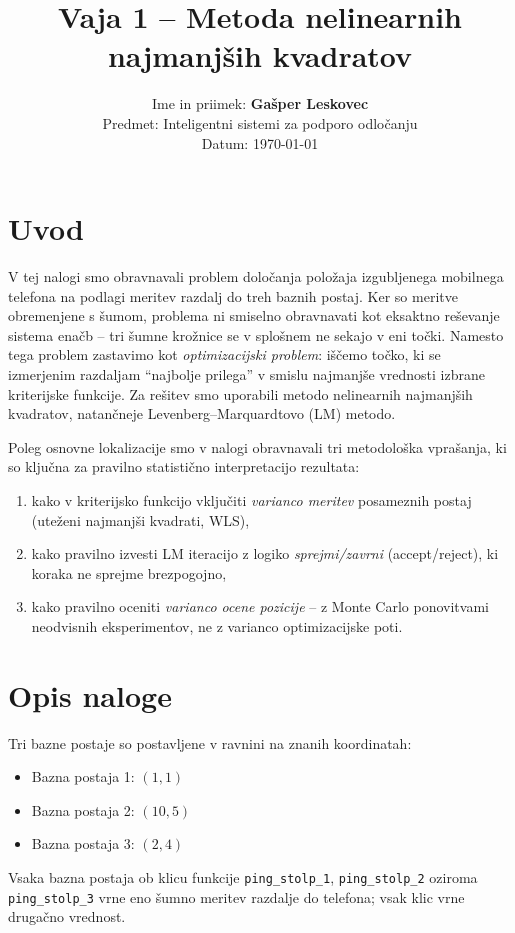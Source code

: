 \documentclass[a4paper,11pt]{article}
\title{Vaja 1 -- Metoda nelinearnih najmanjših kvadratov}
\author{Ime in priimek: \textbf{Gašper Leskovec} \\
Predmet: Inteligentni sistemi za podporo odločanju \\
Datum: \today}
\date{}
\begin{document}
\maketitle

\section{Uvod}
V tej nalogi smo obravnavali problem določanja položaja izgubljenega mobilnega telefona na podlagi meritev razdalj do treh baznih postaj. Ker so meritve obremenjene s šumom, problema ni smiselno obravnavati kot eksaktno reševanje sistema enačb -- tri šumne krožnice se v splošnem ne sekajo v eni točki. Namesto tega problem zastavimo kot \emph{optimizacijski problem}: iščemo točko, ki se izmerjenim razdaljam ``najbolje prilega'' v smislu najmanjše vrednosti izbrane kriterijske funkcije. Za rešitev smo uporabili metodo nelinearnih najmanjših kvadratov, natančneje Levenberg--Marquardtovo (LM) metodo.

Poleg osnovne lokalizacije smo v nalogi obravnavali tri metodološka vprašanja, ki so ključna za pravilno statistično interpretacijo rezultata:
\begin{enumerate}
    \item kako v kriterijsko funkcijo vključiti \emph{varianco meritev} posameznih postaj (uteženi najmanjši kvadrati, WLS),
    \item kako pravilno izvesti LM iteracijo z logiko \emph{sprejmi/zavrni} (accept/reject), ki koraka ne sprejme brezpogojno,
    \item kako pravilno oceniti \emph{varianco ocene pozicije} -- z Monte Carlo ponovitvami neodvisnih eksperimentov, ne z varianco optimizacijske poti.
\end{enumerate}

\section{Opis naloge}
Tri bazne postaje so postavljene v ravnini na znanih koordinatah:
\begin{itemize}
    \item Bazna postaja 1: $(1,1)$
    \item Bazna postaja 2: $(10,5)$
    \item Bazna postaja 3: $(2,4)$
\end{itemize}

Vsaka bazna postaja ob klicu funkcije \texttt{ping\_stolp\_1}, \texttt{ping\_stolp\_2} oziroma \texttt{ping\_stolp\_3} vrne eno šumno meritev razdalje do telefona; vsak klic vrne drugačno vrednost.
\end{document}

